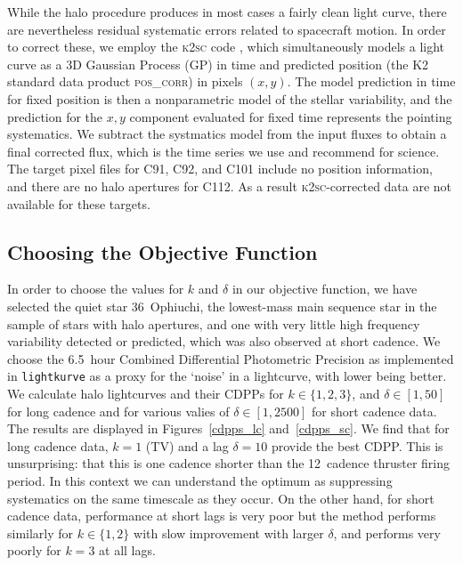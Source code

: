 \documentclass[modern]{aastex62}
\begin{document}
While the halo procedure produces in most cases a fairly clean light curve, there are nevertheless residual systematic errors related to spacecraft motion. In order to correct these, we employ the \textsc{k2sc} code \citep{Aigrain2015,k2sc}, which simultaneously models a light curve as a 3D Gaussian Process (GP) in time and predicted position (the K2 standard data product \textsc{pos\_corr}) in pixels $(x,y)$. The model prediction in time for fixed position is then a nonparametric model of the stellar variability, and the prediction for the $x,y$ component evaluated for fixed time represents the pointing systematics. We subtract the systmatics model from the input fluxes to obtain a final corrected flux, which is the time series we use and recommend for science. The target pixel files for C91, C92, and C101 include no position information, and there are no halo apertures for C112. As a result \textsc{k2sc}-corrected data are not available for these targets.

\subsection{Choosing the Objective Function}
\label{sec:objective}

In order to choose the values for $k$ and $\delta$ in our objective function, we have selected the quiet star 36~Ophiuchi, the lowest-mass main sequence star in the sample of stars with halo apertures, and one with very little high frequency variability detected or predicted, which was also observed at short cadence. We choose the 6.5~hour Combined Differential Photometric Precision \citep[CDPP,][]{cdpp} as implemented in \texttt{lightkurve} \citep{lightkurve} as a proxy for the `noise' in a lightcurve, with lower being better. We calculate halo lightcurves and their CDPPs for $k \in \{1,2,3\}$, and $\delta \in [1,50]$ for long cadence and for various valies of $\delta \in [1,2500]$ for short cadence data. The results are displayed in Figures~\ref{cdpps_lc} and~\ref{cdpps_sc}. We find that for long cadence data, $k=1$ (TV) and a lag $\delta=10$ provide the best CDPP. This is unsurprising: that this is one cadence shorter than the 12~cadence thruster firing period. In this context we can understand the optimum as suppressing systematics on the same timescale as they occur. On the other hand, for short cadence data, performance at short lags is very poor but the method performs similarly for $k \in \{1,2\}$ with slow improvement with larger $\delta$, and performs very poorly for $k=3$ at all lags. 
\end{document}
